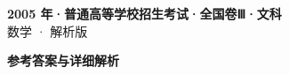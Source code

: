 \documentclass[zihao=-4, a4paper]{ctexart}
\begin{document}
\begin{center}
  {\Large\bfseries 2005 年·普通高等学校招生考试·全国卷Ⅲ·文科}\\[4pt]
  {\large 数学 · 解析版}
\end{center}
\medskip
{}

\clearpage
{}
\begin{center}{\Large\bfseries 参考答案与详细解析}\end{center}
\medskip

\end{document}
